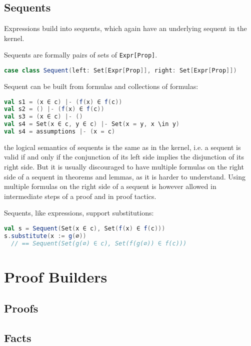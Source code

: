 \subsection{Sequents}

Expressions build into sequents, which again have an underlying sequent in the kernel.

\begin{definition}[Sequents]
  Sequents are formally pairs of sets of \lstinline|Expr[Prop]|.
  \begin{lstlisting}[language=scala]
case class Sequent(left: Set[Expr[Prop]], right: Set[Expr[Prop]])
  \end{lstlisting}
  \noindent
  Sequent can be built from formulas and collections of formulas:
  \begin{lstlisting}[language=scala]
val s1 = (x ∈ c) |- (f(x) ∈ f(c))
val s2 = () |- (f(x) ∈ f(c))
val s3 = (x ∈ c) |- ()
val s4 = Set(x ∈ c, y ∈ c) |- Set(x = y, x \in y)
val s4 = assumptions |- (x = c)
  \end{lstlisting}
  the logical semantics of sequents is the same as in the kernel, i.e. a sequent is valid if and only if the conjunction of its left side implies the disjunction of its right side.
  But it is usually discouraged to have multiple formulas on the right side of a sequent in theorems and lemmas, as it is harder to understand. Using multiple formulas on the right side of a sequent is however allowed in intermediate steps of a proof and in proof tactics.

  Sequents, like expressions, support substitutions:
  \begin{lstlisting}[language=scala]
val s = Sequent(Set(x ∈ c), Set(f(x) ∈ f(c)))
s.substitute(x := g(∅))
  // == Sequent(Set(g(∅) ∈ c), Set(f(g(∅)) ∈ f(c)))
  \end{lstlisting}
\end{definition}

\section{Proof Builders}

\subsection{Proofs}

\subsection{Facts}

